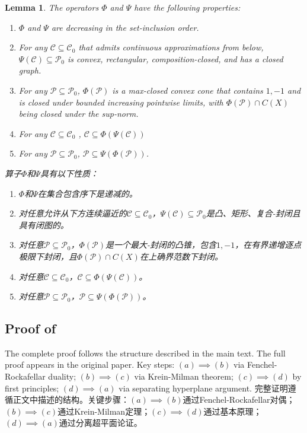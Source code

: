 \documentclass[12pt,letterpaper]{article}
\newenvironment{original}{\color{black}}{}
\newenvironment{translation}{\color{blue}}{}
\theoremstyle{plain}
\newtheorem{lemma}{Lemma}
\theoremstyle{definition}
\theoremstyle{remark}
\newcommand{\Pc}{\mathcal{P}}
\newcommand{\C}{\mathcal{C}}
\theoremstyle{definition}
\begin{document}
\begin{lemma}\label{lem:basic}
\begin{original}
The operators $\Phi$ and $\Psi$ have the following properties:
\begin{enumerate}
\item [(a)] $\Phi$ and $\Psi$ are decreasing in the set-inclusion order.
\item [(b)] For any $\C \subseteq \C_0$ that admits continuous approximations from below, $\Psi(\C) \subseteq \Pc_0$ is convex, rectangular, composition-closed, and has a closed graph.
\item [(c)] For any $\Pc \subseteq \Pc_0$, $\Phi(\Pc)$ is a max-closed convex cone that contains $1,-1$ and is closed under bounded increasing pointwise limits, with $\Phi(\Pc) \cap C(X)$ being closed under the sup-norm.
\item [(d)] For any $\C \subseteq \C_0$ , $\C \subseteq \Phi(\Psi(\C))$
\item [(e)] For any $\Pc \subseteq \Pc_0$, $\Pc \subseteq \Psi(\Phi(\Pc))$.
\end{enumerate}
\end{original}
\begin{translation}
算子$\Phi$和$\Psi$具有以下性质：
\begin{enumerate}
\item [(a)] $\Phi$和$\Psi$在集合包含序下是递减的。
\item [(b)] 对任意允许从下方连续逼近的$\C \subseteq \C_0$，$\Psi(\C) \subseteq \Pc_0$是凸、矩形、复合-封闭且具有闭图的。
\item [(c)] 对任意$\Pc \subseteq \Pc_0$，$\Phi(\Pc)$是一个最大-封闭的凸锥，包含$1,-1$，在有界递增逐点极限下封闭，且$\Phi(\Pc) \cap C(X)$在上确界范数下封闭。
\item [(d)] 对任意$\C \subseteq \C_0$，$\C \subseteq \Phi(\Psi(\C))$。
\item [(e)] 对任意$\Pc \subseteq \Pc_0$，$\Pc \subseteq \Psi(\Phi(\Pc))$。
\end{enumerate}
\end{translation}
\end{lemma}

\subsection{Proof of \texorpdfstring{}{Theorem 1}}
\begin{original}
The complete proof follows the structure described in the main text. The full proof appears in the original paper. Key steps: $(a)\implies(b)$ via Fenchel-Rockafellar duality; $(b)\implies(c)$ via Krein-Milman theorem; $(c)\implies(d)$ by first principles; $(d)\implies(a)$ via separating hyperplane argument.
\end{original}
\begin{translation}
完整证明遵循正文中描述的结构。关键步骤：$(a)\implies(b)$通过Fenchel-Rockafellar对偶；$(b)\implies(c)$通过Krein-Milman定理；$(c)\implies(d)$通过基本原理；$(d)\implies(a)$通过分离超平面论证。
\end{translation}
\end{document}
